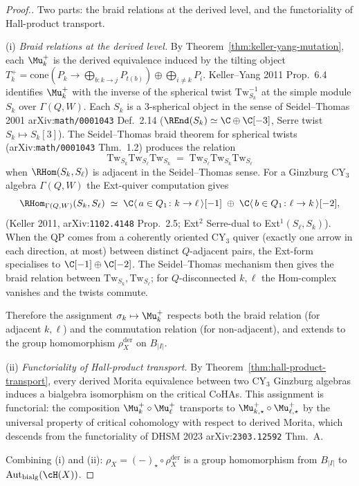 \begin{proof}[Proof.]
Two parts: the braid relations at the derived level, and the functoriality
of Hall-product transport.

(i) \emph{Braid relations at the derived level.} By
Theorem~\ref{thm:keller-yang-mutation}, each $\Mu_k^{+}$ is the derived
equivalence induced by the tilting object $T_k^{+} = \mathrm{cone}(P_k \to
\bigoplus_{b \colon k \to j} P_{t(b)}) \oplus \bigoplus_{i \neq k} P_i$.
Keller--Yang 2011 Prop.~6.4 identifies $\Mu_k^{+}$ with the inverse of the
spherical twist $\mathrm{Tw}_{S_k}^{-1}$ at the simple module $S_k$ over
$\Gamma(Q, W)$. Each $S_k$ is a $3$-spherical object in the sense of
Seidel--Thomas 2001 arXiv:\texttt{math/0001043} Def.~2.14
($\REnd(S_k) \simeq \C \oplus \C[-3]$, Serre twist $S_k \mapsto S_k[3]$).
The Seidel--Thomas braid theorem for spherical twists
(arXiv:\texttt{math/0001043} Thm.~1.2) produces the relation
\[
 \mathrm{Tw}_{S_k} \mathrm{Tw}_{S_\ell} \mathrm{Tw}_{S_k}
 \;=\;
 \mathrm{Tw}_{S_\ell} \mathrm{Tw}_{S_k} \mathrm{Tw}_{S_\ell}
\]
when $\RHom(S_k, S_\ell)$ is adjacent in the Seidel--Thomas sense. For a
Ginzburg CY$_3$ algebra $\Gamma(Q, W)$ the Ext-quiver computation gives
\[
 \RHom_{\Gamma(Q, W)}(S_k, S_\ell) \;\simeq\;
 \C\langle\, a \in Q_1 \colon k \to \ell \,\rangle[-1]
 \;\oplus\;
 \C\langle\, b \in Q_1 \colon \ell \to k \,\rangle[-2],
\]
(Keller 2011, arXiv:\texttt{1102.4148} Prop.~2.5; Ext$^2$ Serre-dual to
Ext$^1(S_\ell, S_k)$). When the QP comes from a coherently oriented CY$_3$
quiver (exactly one arrow in each direction, at most) between distinct
$Q$-adjacent pairs, the Ext-form specialises to $\C[-1] \oplus \C[-2]$.
The Seidel--Thomas mechanism then gives the braid relation
between $\mathrm{Tw}_{S_k}, \mathrm{Tw}_{S_\ell}$; for $Q$-disconnected
$k, \ell$ the Hom-complex vanishes and the twists commute.

Therefore the assignment $\sigma_k \mapsto \Mu_k^{+}$ respects both the
braid relation (for adjacent $k, \ell$) and the commutation relation (for
non-adjacent), and extends to the group homomorphism $\rho_X^{\mathrm{der}}$
on $B_{|I|}$.

(ii) \emph{Functoriality of Hall-product transport.} By
Theorem~\ref{thm:hall-product-transport}, every derived Morita equivalence
between two CY$_3$ Ginzburg algebras induces a bialgebra isomorphism on the
critical CoHAs. This assignment is functorial: the composition
$\Mu_k^{+} \circ \Mu_\ell^{+}$ transports to $\Mu_{k,\star}^{+} \circ
\Mu_{\ell,\star}^{+}$ by the universal property of critical cohomology with
respect to derived Morita, which descends from the functoriality of
DHSM 2023 arXiv:\texttt{2303.12592} Thm.~A.

Combining (i) and (ii): $\rho_X = (-)_{\star} \circ \rho_X^{\mathrm{der}}$
is a group homomorphism from $B_{|I|}$ to
$\mathrm{Aut}_{\mathrm{bialg}}(\cH(X))$.
\end{proof}

